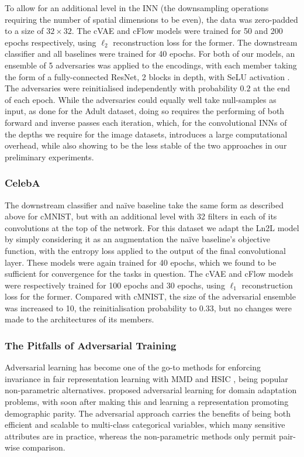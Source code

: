 To allow for an additional level in the INN (the downsampling operations requiring the number of spatial dimensions to be even), the data was zero-padded to a size of $32\times32$. The cVAE and cFlow models were trained for 50 and 200 epochs respectively, using $\ell_2$ reconstruction loss for the former. The downstream classifier and all baselines were trained for 40 epochs. For both of our models, an ensemble of 5 adversaries was applied to the encodings, with each member taking the form of a fully-connected ResNet, 2 blocks in depth, with SeLU activation \cite{klambauer2017self}. The adversaries were reinitialised independently with probability $0.2$ at the end of each epoch. While the adversaries could equally well take  null-samples as input, as done for the Adult dataset, doing so requires the performing of both forward and inverse passes each iteration, which, for the convolutional INNs of the depths we require for the image datasets, introduces a large computational overhead, while also showing to be the less stable of the two approaches in our preliminary experiments.

\subsubsection{CelebA} 
The downstream classifier and na\"ive baseline take the same form as described above for cMNIST, but with an additional level with 32 filters in each of its convolutions at the top of the network. For this dataset we adapt the Ln2L model by simply considering it as an augmentation the na\"ive baseline's objective function, with the entropy loss applied to the output of the final convolutional layer. These models were again trained for 40 epochs, which we found to be sufficient for convergence for the tasks in question. The cVAE and cFlow models were respectively trained for 100 epochs and 30 epochs, using $\ell_1$ reconstruction loss for the former. Compared with cMNIST, the size of the adversarial ensemble was increased to 10, the reinitialisation probability to 0.33, but no changes were made to the architectures of its members.

\subsubsection{The Pitfalls of Adversarial Training}\label{ssec:pitfalls}
Adversarial learning has become one of the go-to methods for enforcing invariance in fair representation learning \cite{ganin2016domain} with MMD \cite{LouSweLi15} and HSIC \cite{QuaShaTho19}, being popular non-parametric alternatives.
\cite{ganin2016domain} proposed adversarial learning for domain adaptation problems, with \cite{edwardsstorkey} soon after making this and learning a representation promoting demographic parity.
The adversarial approach carries the benefits of being both efficient and scalable to multi-class categorical variables, which many sensitive attributes are in practice, whereas the non-parametric methods only permit pair-wise comparison.

